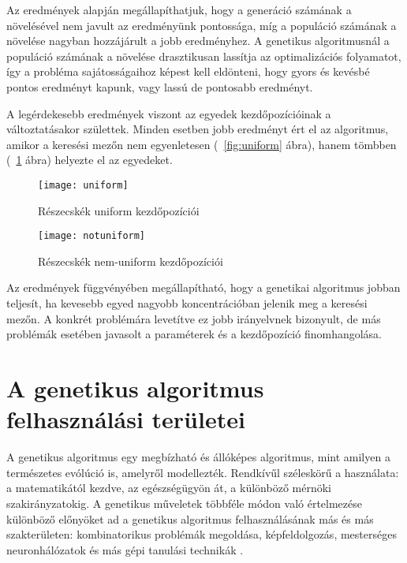 Az eredmények alapján megállapíthatjuk, hogy a generáció számának a növelésével nem javult az eredményünk pontossága, míg a populáció számának a növelése nagyban hozzájárult a jobb eredményhez. A genetikus algoritmusnál a populáció számának a növelése drasztikusan lassítja az optimalizációs folyamatot, így a probléma sajátosságaihoz képest kell eldönteni, hogy gyors és kevésbé pontos eredményt kapunk, vagy lassú de pontosabb eredményt.

A legérdekesebb eredmények viszont az egyedek kezdőpozícióinak a változtatásakor születtek. Minden esetben jobb eredményt ért el az algoritmus, amikor a keresési mezőn nem egyenletesen (~\ref{fig:uniform} ábra), hanem tömbben (~\ref{fig:notuniform} ábra) helyezte el az egyedeket.

\begin{figure}
    \centering
    \texttt{[image: uniform]}
    \caption{Részecskék uniform kezdőpozíciói}
    \label{fig:uniform}
    \centering
    \texttt{[image: notuniform]}
    \caption{Részecskék nem-uniform kezdőpozíciói}
    \label{fig:notuniform}
\end{figure}

Az eredmények függvényében megállapítható, hogy a genetikai algoritmus jobban teljesít, ha kevesebb egyed nagyobb koncentrációban jelenik meg a keresési mezőn. A konkrét problémára levetítve ez jobb irányelvnek bizonyult, de más problémák esetében javasolt a paraméterek és a kezdőpozíció finomhangolása.

\section{A genetikus algoritmus felhasználási területei}

A genetikus algoritmus egy megbízható és állóképes algoritmus, mint amilyen a természetes evólúció is, amelyről modellezték. Rendkívűl széleskörű a használata: a matematikától kezdve, az egészségügyön át, a különböző mérnöki szakirányzatokig. A genetikus műveletek többféle módon való értelmezése különböző előnyöket ad a genetikus algoritmus felhasználásának más és más szakterületen: kombinatorikus problémák megoldása, képfeldolgozás, mesterséges neuronhálózatok és más gépi tanulási technikák \parencite{kanovic2017}.
